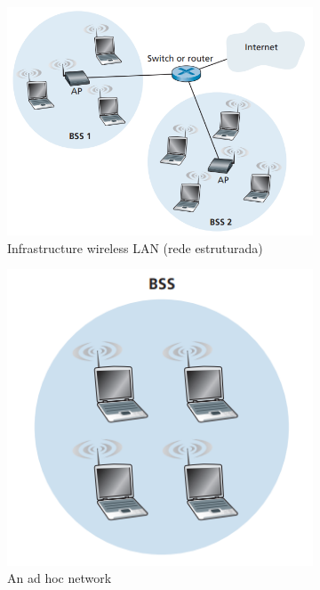 \vspace{-1.5 em}
\begin{figure}[ht] 
    \begin{subfigure}[b]{0.5\linewidth}%
        \centering
        \includegraphics[width=0.8\linewidth]{img/5/rede-estruturada.png}
        \caption{Infrastructure wireless LAN (rede estruturada) \cite{Kurose2017}} 
        \label{fig:WiFi-net-a} 
    \end{subfigure}%
    \begin{subfigure}[b]{0.5\linewidth}
        \centering
        \includegraphics[width=0.8\linewidth]{img/5/rede-ad-hoc.png} 
        \caption{An ad hoc network \cite{Kurose2017}} 
        \label{fig:WiFi-net-b} 
    \end{subfigure}
    \caption{}
\end{figure}

